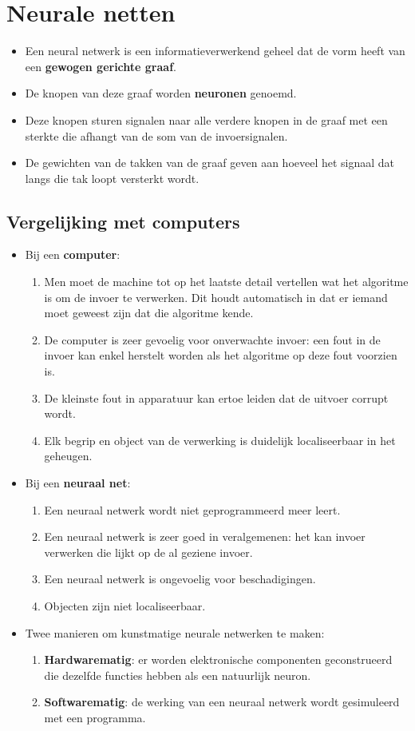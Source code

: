 \chapter{Neurale netten}
\begin{itemize}
	\item Een neural netwerk is een informatieverwerkend geheel dat de vorm heeft van een \textbf{gewogen gerichte graaf}.
	\item De knopen van deze graaf worden \textbf{neuronen} genoemd.
	\item Deze knopen sturen signalen naar alle verdere knopen in de graaf met een sterkte die afhangt van de som van de invoersignalen.
	\item De gewichten van de takken van de graaf geven aan hoeveel het signaal dat langs die tak loopt versterkt wordt.
\end{itemize}


\section{Vergelijking met computers}
\begin{itemize}
	\item Bij een \textbf{computer}:
	\begin{enumerate}
		\item Men moet de machine tot op het laatste detail vertellen wat het algoritme is om de invoer te verwerken. Dit houdt automatisch in dat er iemand moet geweest zijn dat die algoritme kende.
		\item De computer is zeer gevoelig voor onverwachte invoer: een fout in de invoer kan enkel herstelt worden als het algoritme op deze fout voorzien is.
		\item De kleinste fout in apparatuur kan ertoe leiden dat de uitvoer corrupt wordt. 
		\item Elk begrip en object van de verwerking is duidelijk localiseerbaar in het geheugen.
	\end{enumerate}
	\item Bij een \textbf{neuraal net}:
	\begin{enumerate}
		\item Een neuraal netwerk wordt niet geprogrammeerd meer leert.
		\item Een neuraal netwerk is zeer goed in veralgemenen: het kan invoer verwerken die lijkt op de al geziene invoer.
		\item Een neuraal netwerk is ongevoelig voor beschadigingen.
		\item Objecten zijn niet localiseerbaar.
	\end{enumerate}
	\item Twee manieren om kunstmatige neurale netwerken te maken:
	\begin{enumerate}
		\item \textbf{Hardwarematig}: er worden elektronische componenten geconstrueerd die dezelfde functies hebben als een natuurlijk neuron. 
		\item \textbf{Softwarematig}: de werking van een neuraal netwerk wordt gesimuleerd met een programma.
	\end{enumerate}
\end{itemize}
